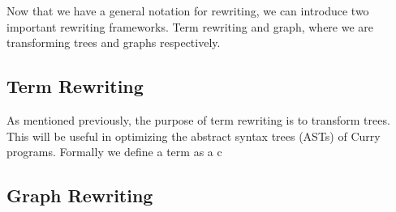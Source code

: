 \documentclass{article}
\begin{document}
Now that we have a general notation for rewriting, we can introduce two important rewriting frameworks.
Term rewriting and graph, where we are transforming trees and graphs respectively.


\subsection{Term Rewriting}

As mentioned previously, the purpose of term rewriting is to transform trees.
This will be useful in optimizing the abstract syntax trees (ASTs) of Curry programs.
Formally we define a term as a c
\subsection{Graph Rewriting}
\end{document}
